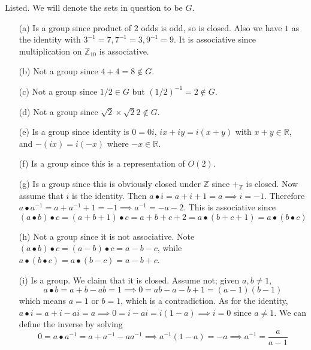   \begin{solution}
    Listed. We will denote the sets in question to be $G$. 
    \begin{enumerate}
      \item[(a)] Is a group since product of 2 odds is odd, so is closed. Also we have $1$ as the identity with $3^{-1} = 7, 7^{-1} = 3, 9^{-1} = 9$. It is associative since multiplication on $\mathbb{Z}_{10}$ is associative. 
      \item[(b)] Not a group since $4 + 4 = 8 \not\in G$. 
      \item[(c)] Not a group since $1/2 \in G$ but $(1/2)^{-1} = 2 \not\in G$. 
      \item[(d)] Not a group since $\sqrt{2} \times \sqrt{2} 2  \not\in G$. 
      \item[(e)] Is a group since identity is $0 = 0i$, $ix + iy = i (x + y)$ with $x + y \in \mathbb{R}$, and $-(ix) = i (-x)$ where $-x \in \mathbb{R}$. 
      \item[(f)] Is a group since this is a representation of $O(2)$. 
      \item[(g)] Is a group since this is obviously closed under $\mathbb{Z}$ since $+_{\mathbb{Z}}$ is closed. Now assume that $i$ is the identity. Then $a \bullet i = a + i + 1 = a \implies i = -1$. Therefore $a \bullet a^{-1} = a + a^{-1} + 1 = -1 \implies a^{-1} = -a - 2$. This is associative since 
      \begin{equation}
        (a \bullet b) \bullet c = (a + b + 1) \bullet c = a + b + c + 2 = a \bullet (b + c + 1) = a \bullet (b \bullet c)
      \end{equation}
      \item[(h)] Not a group since it is not associative. Note $(a \bullet b) \bullet c = (a - b) \bullet c = a - b - c$, while $a \bullet (b \bullet c) = a \bullet (b - c) = a - b + c$. 
      \item[(i)] Is a group. We claim that it is closed. Assume not; given $a, b \neq 1$, 
        \begin{equation}
          a \bullet b = a + b - ab = 1 \implies 0 = ab - a - b + 1 = (a - 1)(b-1) 
        \end{equation}
        which means $a = 1$ or $b = 1$, which is a contradiction. As for the identity, $a \bullet i = a + i - ai = a \implies 0 = i - ai = i (1 - a) \implies i = 0$ since $a \neq 1$. We can define the inverse by solving 
        \begin{equation}
          0 = a \bullet a^{-1} = a + a^{-1} - a a^{-1} \implies a^{-1} (1 - a) = -a \implies a^{-1} = \frac{a}{a-1}

\end{equation}
\end{enumerate}
\end{solution}
